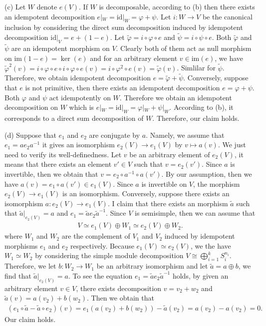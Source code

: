 \begin{solution}
    (c) Let $W$ denote $e(V)$.
     If $W$ is decomposable, according to (b) then there exists an idempotent decomposition $e|_{W}=\text{id}|_{W}=\varphi+\psi $. 
     Let $i:W\to V$ be the canonical inclusion by considering the direct sum decomposition induced by idempotent decomposition $\text{id}|_V = e+(1-e)$. Let $\tilde{\varphi}=i\circ \varphi \circ e$ and $\tilde{\psi}=i\circ \psi \circ e$.
     Both $\tilde{\varphi}$ and $\tilde{\psi}$ are an idempotent morphism on $V$. Clearly both of them act as null morphism on $\text{im}(1-e)=\ker(e)$ and for an arbitrary element $v\in\text{im}(e)$,
    we have $\tilde{\varphi}^2(v)=i\circ \varphi\circ e \circ i \circ \varphi\circ e(v)= i\circ \varphi^2\circ e(v)=\tilde{\varphi}(v)$. Simlilar for $\tilde{\psi}$.
    Therefore, we obtain idempotent decomposition $e = \tilde{\varphi}+\tilde{\psi}$.
    Conversely, suppose that $e$ is not primitive, then there exists an idempotent decomposition $e=\varphi+\psi$. Both $\varphi$ and $\psi$ act idempotently on $W$. Therefore we obtain an idempotent decomposition on $W$ which is $e|_W =\text{id}|_W = \varphi|_W+\psi|_W $.
    According to (b), it corresponds to a direct sum decomposition of $W$. Therefore, our claim holds.

    (d) Suppose that $e_1$ and $e_2$ are conjugate by $a$. Namely, we assume that $e_1=ae_2a^{-1}$ it gives an isomorphism $e_2(V)\to e_1(V)$ by $v\mapsto a(v)$.
    We just need to verify its well-definedness. Let $v$ be an arbitrary element of $e_2(V)$, it means that there exists an element $v'\in V$ such that $v=e_2(v')$.
    Since $a$ is invertible, then we obtain that $v=e_2\circ a^{-1}\circ a(v')$. By our assumption, then we have $a(v) = e_1\circ a(v')\in e_1(V)$. Since $a$ is invertible on $V$,
    the morphism $e_2(V)\to e_1(V)$ is an isomorphism.
    Conversely, suppose there exists an isomorphism $a:e_2(V)\to e_1(V)$. I claim that there exists an morphism $\tilde{a}$ such that $\tilde{a}|_{e_2(V)}= a$ and $e_1=\tilde{a} e_2 \tilde{a}^{-1}$.
    Since $V$ is semisimple, then we can assume that 
    \begin{align*}
         V\simeq e_1(V)\oplus W_1 \simeq e_2(V)\oplus W_2.
    \end{align*}
    where $W_1$ and $W_2$ are the complement of $V_1$ and $V_2$ induced by idempotent morphisms $e_1$ and $e_2$ respectively.
    Because $e_1(V)\simeq e_2(V)$, we the have $W_1\simeq W_2$ by considering the simple module decomposition $V \cong \bigoplus_{i=1}^k S_i^{n_i}$.
    Therefore, we let $b:W_2\to W_1$ be an arbitrary isomorphism and let $\tilde{a}=a\oplus b$, we find that $\tilde{a}|_{e_2(V)}=a$.
    To see the equation $e_1=\tilde{a} e_2 \tilde{a}^{-1}$ holds, by given an arbitrary element $v\in V$, there exists decomposition $v=v_2+w_2$ and $\tilde{a}(v)=a(v_2)+b(w_2)$.
    Then we obtain that 
    \begin{align*}
        (e_1\circ \tilde{a}-  \tilde{a}\circ e_2) (v) = e_1(a(v_2)+b(w_2))-\tilde{a}(v_2) = a(v_2)-a(v_2)=0.
    \end{align*}
    Our claim holds.


\end{solution}
